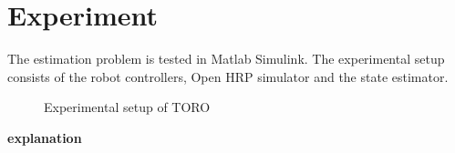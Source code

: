 \section{Experiment}
The estimation problem is tested in Matlab Simulink. The experimental setup consists of the robot controllers, Open HRP simulator and the state estimator.

\begin{figure}
    
    \caption{Experimental setup of TORO}
\end{figure}

\textbf{explanation}

